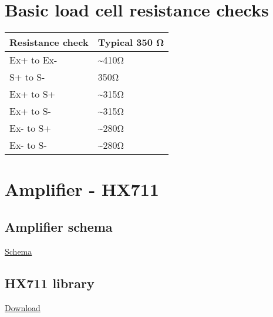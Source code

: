 \documentclass[11pt]{article}
\author{Jacob}
\date{\today}
\title{}
\begin{document}
\tableofcontents

\section{Basic load cell resistance checks}
\label{sec:org51f4273}
\begin{center}
\begin{tabular}{ll}
Resistance check & Typical 350 Ω\\
\hline
Ex+ to Ex- & \textasciitilde{}410Ω\\
S+ to S- & 350Ω\\
Ex+ to S+ & \textasciitilde{}315Ω\\
Ex+ to S- & \textasciitilde{}315Ω\\
Ex- to S+ & \textasciitilde{}280Ω\\
Ex- to S- & \textasciitilde{}280Ω\\
\end{tabular}
\end{center}
\section{Amplifier - HX711}
\label{sec:org8397ea9}
\subsection{Amplifier schema}
\label{sec:org8a2ccc4}
\href{amplifier\_schema.png}{Schema}
\subsection{HX711 library}
\label{sec:orgea32e1a}
\href{https://halckemy.s3.amazonaws.com/uploads/attachments/392655/HX711-master.zip}{Download}
\end{document}
